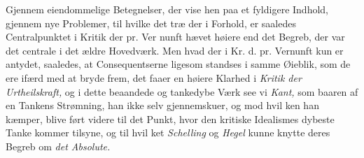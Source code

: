 Gjennem eiendommelige Betegnelser, der vise hen paa et
fyldigere Indhold, gjennem nye Problemer, til hvilke det træ\-%
der i Forhold, er saaledes Centralpunktet i Kritik der pr. Ver\-%
\setcounter{footnote}{0}%
nunft hævet høiere end det Begreb, der var det centrale i det
ældre Hovedværk. Men hvad der i Kr. d. pr. Vernunft kun
er antydet, saaledes, at Consequentserne ligesom standses i
samme Øieblik, som de ere ifærd med at bryde frem, det faaer
en høiere Klarhed i \emph{Kritik der Urtheilskraft,} og i dette
beaandede og tankedybe Værk see vi \emph{Kant,} som baaren af en
Tankens Strømning, han ikke selv gjennemskuer, og mod hvil\-%
ken han kæmper, blive ført videre til det Punkt, hvor den
kritiske Idealismes dybeste Tanke kommer tilsyne, og til hvil\-%
ket \emph{Schelling} og \emph{Hegel} kunne knytte deres Begreb om
\emph{det Absolute.}

